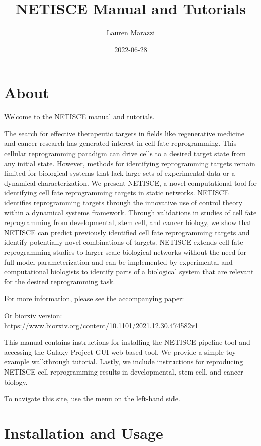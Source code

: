 \documentclass[
]{book}
\title{NETISCE Manual and Tutorials}
\author{Lauren Marazzi}
\date{2022-06-28}
\begin{document}
\maketitle

{
\setcounter{tocdepth}{1}
\tableofcontents
}
\hypertarget{about}{%
\chapter{About}\label{about}}

Welcome to the NETISCE manual and tutorials.

The search for effective therapeutic targets in fields like regenerative medicine and cancer research has generated interest in cell fate reprogramming. This cellular reprogramming paradigm can drive cells to a desired target state from any initial state. However, methods for identifying reprogramming targets remain limited for biological systems that lack large sets of experimental data or a dynamical characterization. We present NETISCE, a novel computational tool for identifying cell fate reprogramming targets in static networks. NETISCE identifies reprogramming targets through the innovative use of control theory within a dynamical systems framework. Through validations in studies of cell fate reprogramming from developmental, stem cell, and cancer biology, we show that NETISCE can predict previously identified cell fate reprogramming targets and identify potentially novel combinations of targets. NETISCE extends cell fate reprogramming studies to larger-scale biological networks without the need for full model parameterization and can be implemented by experimental and computational biologists to identify parts of a biological system that are relevant for the desired reprogramming task.

For more information, please see the accompanying paper:

Or biorxiv version: \url{https://www.biorxiv.org/content/10.1101/2021.12.30.474582v1}

This manual contains instructions for installing the NETISCE pipeline tool and accessing the Galaxy Project GUI web-based tool. We provide a simple toy example walkthrough tutorial. Lastly, we include instructions for reproducing NETISCE cell reprogramming results in developmental, stem cell, and cancer biology.

To navigate this site, use the menu on the left-hand side.

\hypertarget{installation-and-usage}{%
\chapter{Installation and Usage}\label{installation-and-usage}}
\end{document}
